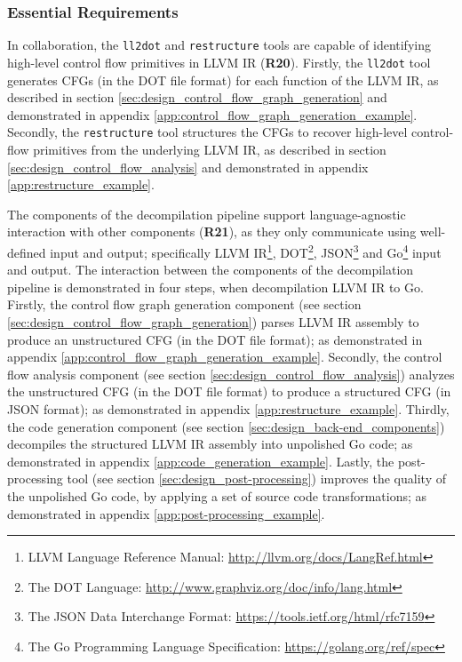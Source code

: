 
\subsubsection{Essential Requirements}
\label{sec:eval_control_flow_analysis_tool_essential_requirements}


In collaboration, the \texttt{ll2dot} and \texttt{restructure} tools are capable of identifying high-level control flow primitives in LLVM IR (\textbf{R20}). Firstly, the \texttt{ll2dot} tool generates CFGs (in the DOT file format) for each function of the LLVM IR, as described in section \ref{sec:design_control_flow_graph_generation} and demonstrated in appendix \ref{app:control_flow_graph_generation_example}. Secondly, the \texttt{restructure} tool structures the CFGs to recover high-level control-flow primitives from the underlying LLVM IR, as described in section \ref{sec:design_control_flow_analysis} and demonstrated in appendix \ref{app:restructure_example}.


The components of the decompilation pipeline support language-agnostic interaction with other components (\textbf{R21}), as they only communicate using well-defined input and output; specifically LLVM IR\footnote{LLVM Language Reference Manual: \url{http://llvm.org/docs/LangRef.html}}, DOT\footnote{The DOT Language: \url{http://www.graphviz.org/doc/info/lang.html}}, JSON\footnote{The JSON Data Interchange Format: \url{https://tools.ietf.org/html/rfc7159}} and Go\footnote{The Go Programming Language Specification: \url{https://golang.org/ref/spec}} input and output. The interaction between the components of the decompilation pipeline is demonstrated in four steps, when decompilation LLVM IR to Go. Firstly, the control flow graph generation component (see section \ref{sec:design_control_flow_graph_generation}) parses LLVM IR assembly to produce an unstructured CFG (in the DOT file format); as demonstrated in appendix \ref{app:control_flow_graph_generation_example}. Secondly, the control flow analysis component (see section \ref{sec:design_control_flow_analysis}) analyzes the unstructured CFG (in the DOT file format) to produce a structured CFG (in JSON format); as demonstrated in appendix \ref{app:restructure_example}. Thirdly, the code generation component (see section \ref{sec:design_back-end_components}) decompiles the structured LLVM IR assembly into unpolished Go code; as demonstrated in appendix \ref{app:code_generation_example}. Lastly, the post-processing tool (see section \ref{sec:design_post-processing}) improves the quality of the unpolished Go code, by applying a set of source code transformations; as demonstrated in appendix \ref{app:post-processing_example}.
